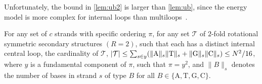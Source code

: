 Unfortunately, the bound in \cref{lem:ub2} is larger than \cref{lem:ub}, since the energy model is more complex for internal loops than multiloops~\cite{dirks2003partition}. 

\begin{lemma}\label{lem:ub2}
	For any set of $c$ strands with specific ordering $\pi$, for any set $\mathcal{T}$ of $2$-fold rotational symmetric secondary structures $(R=2)$, 
	such that each has a distinct internal central loop, the  cardinality of $\mathcal{T}$, $ |\mathcal{T}| \leq \sum_{s\in y} (\lVert \mathrm{A} \rVert_s \lVert \mathrm{T} \rVert_s+ \lVert \mathrm{G} \rVert_s \lVert \mathrm{C} \rVert_s ) \leq N^2/16$, 
	where $y$ is a fundamental component of $\pi$, such that $\pi = y^2$, and $\parallel\! \! B \!\! \parallel_s$  
	denotes the number of bases in strand $s$ of type $B$ for all $B\in\{\mathrm{A},\mathrm{T},\mathrm{G},\mathrm{C}\}$.
\end{lemma} 

